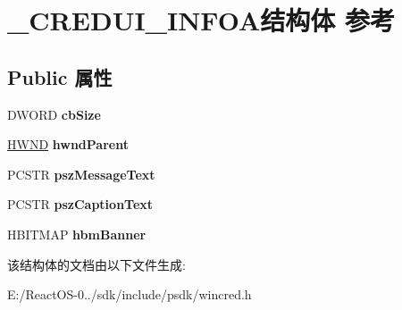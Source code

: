 \hypertarget{struct___c_r_e_d_u_i___i_n_f_o_a}{}\section{\+\_\+\+C\+R\+E\+D\+U\+I\+\_\+\+I\+N\+F\+O\+A结构体 参考}
\label{struct___c_r_e_d_u_i___i_n_f_o_a}
\subsection*{Public 属性}
\begin{DoxyCompactItemize}
\item 
\mbox{\label{struct___c_r_e_d_u_i___i_n_f_o_a_abc91cf1089da366cd1f27f9eab99b8de}} 
D\+W\+O\+RD {\bfseries cb\+Size}
\item 
\mbox{\label{struct___c_r_e_d_u_i___i_n_f_o_a_ac17f74914daacaf1ef466d788858c75d}} 
\hyperlink{interfacevoid}{H\+W\+ND} {\bfseries hwnd\+Parent}
\item 
\mbox{\label{struct___c_r_e_d_u_i___i_n_f_o_a_ae621b19678fb13a5f17206fa532b36c9}} 
P\+C\+S\+TR {\bfseries psz\+Message\+Text}
\item 
\mbox{\label{struct___c_r_e_d_u_i___i_n_f_o_a_a031130d2ae5d148886179bd87f934176}} 
P\+C\+S\+TR {\bfseries psz\+Caption\+Text}
\item 
\mbox{\label{struct___c_r_e_d_u_i___i_n_f_o_a_adec25601dbaef699657e70b2d6c53cc8}} 
H\+B\+I\+T\+M\+AP {\bfseries hbm\+Banner}
\end{DoxyCompactItemize}


该结构体的文档由以下文件生成\+:\begin{DoxyCompactItemize}
\item 
E\+:/\+React\+O\+S-\/0../sdk/include/psdk/wincred.\+h\end{DoxyCompactItemize}
